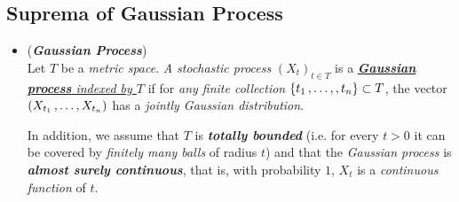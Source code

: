 \documentclass[11pt]{article}
\begin{document}
\subsection{Suprema of Gaussian Process}
\begin{itemize}
\item \begin{definition} (\textbf{\emph{Gaussian Process}})\\
Let $T$ be a \emph{metric space}. \emph{A stochastic process} $(X_t)_{t \in T}$ is a \underline{\emph{\textbf{Gaussian process} indexed by $T$}} if for  \emph{any finite collection} $\left\{t_1 \,{,}\ldots{,}\,, t_n\right\} \subset T$, the vector $(X_{t_1} \,{,}\ldots{,}\, X_{t_n})$ has a \emph{jointly Gaussian distribution}.

In addition, we assume that $T$ is \emph{\textbf{totally bounded}} (i.e. for every $t > 0$ it can be covered by \emph{finitely many balls} of radius $t$) and that the \emph{Gaussian process} is \emph{\textbf{almost surely continuous}}, that is, with probability $1$, $X_t$ is a \emph{continuous function} of $t$.
\end{definition} 


\end{itemize}
\end{document}
